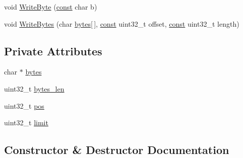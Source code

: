 \begin{DoxyCompactItemize}
\item 
void \mbox{\hyperlink{classlucene_1_1core_1_1store_1_1ByteArrayReferenceDataOutput_a8fe0203aa432ae75b9fb280414476b80}{Write\+Byte}} (\mbox{\hyperlink{ZlibCrc32_8h_a2c212835823e3c54a8ab6d95c652660e}{const}} char b)
\item 
void \mbox{\hyperlink{classlucene_1_1core_1_1store_1_1ByteArrayReferenceDataOutput_a56eb71d664e7f32fd874acdf0c899e0c}{Write\+Bytes}} (char \mbox{\hyperlink{classlucene_1_1core_1_1store_1_1ByteArrayReferenceDataOutput_abcc6354e688741b6aeee2e92810d6830}{bytes}}\mbox{[}$\,$\mbox{]}, \mbox{\hyperlink{ZlibCrc32_8h_a2c212835823e3c54a8ab6d95c652660e}{const}} uint32\+\_\+t offset, \mbox{\hyperlink{ZlibCrc32_8h_a2c212835823e3c54a8ab6d95c652660e}{const}} uint32\+\_\+t length)
\end{DoxyCompactItemize}
\subsection*{Private Attributes}
\begin{DoxyCompactItemize}
\item 
char $\ast$ \mbox{\hyperlink{classlucene_1_1core_1_1store_1_1ByteArrayReferenceDataOutput_abcc6354e688741b6aeee2e92810d6830}{bytes}}
\item 
uint32\+\_\+t \mbox{\hyperlink{classlucene_1_1core_1_1store_1_1ByteArrayReferenceDataOutput_af7559d89752c8df6dc14ced938e9edff}{bytes\+\_\+len}}
\item 
uint32\+\_\+t \mbox{\hyperlink{classlucene_1_1core_1_1store_1_1ByteArrayReferenceDataOutput_ac7be7cf8a0d106f0cd2319c2d4d17a7c}{pos}}
\item 
uint32\+\_\+t \mbox{\hyperlink{classlucene_1_1core_1_1store_1_1ByteArrayReferenceDataOutput_a9d38ace165736b26c770ba9bb542a488}{limit}}
\end{DoxyCompactItemize}


\subsection{Constructor \& Destructor Documentation}
\mbox{\label{classlucene_1_1core_1_1store_1_1ByteArrayReferenceDataOutput_acd5e49aa4aa0d360625f1b6c6915e46e}} 
